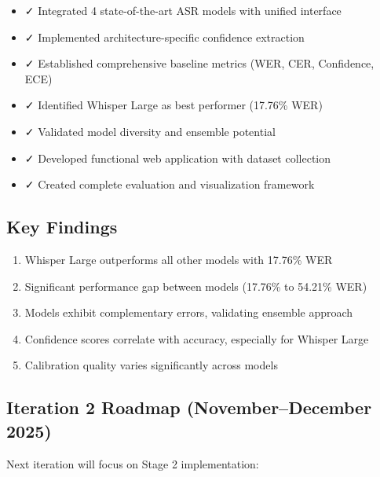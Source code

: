 \begin{itemize}
    \item ✓ Integrated 4 state-of-the-art ASR models with unified interface
    \item ✓ Implemented architecture-specific confidence extraction
    \item ✓ Established comprehensive baseline metrics (WER, CER, Confidence, ECE)
    \item ✓ Identified Whisper Large as best performer (17.76\% WER)
    \item ✓ Validated model diversity and ensemble potential
    \item ✓ Developed functional web application with dataset collection
    \item ✓ Created complete evaluation and visualization framework
\end{itemize}

\subsection{Key Findings}

\begin{enumerate}
    \item Whisper Large outperforms all other models with 17.76\% WER
    \item Significant performance gap between models (17.76\% to 54.21\% WER)
    \item Models exhibit complementary errors, validating ensemble approach
    \item Confidence scores correlate with accuracy, especially for Whisper Large
    \item Calibration quality varies significantly across models
\end{enumerate}

\subsection{Iteration 2 Roadmap (November--December 2025)}

Next iteration will focus on Stage 2 implementation:

